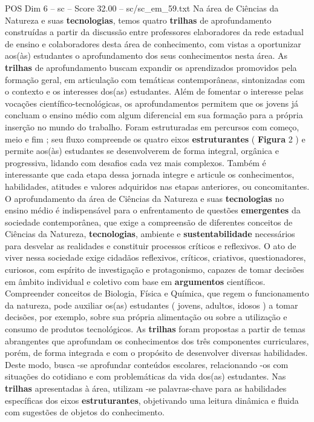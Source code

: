 \begin{textsample}{POS Dim 6 – sc – Score 32.00 – sc/sc\_em\_59.txt}
Na área de Ciências da Natureza e suas \textbf{tecnologias}, temos quatro \textbf{trilhas} de aprofundamento construídas a partir da discussão entre professores elaboradores da rede estadual de ensino e colaboradores desta área de conhecimento, com vistas a oportunizar aos(às) estudantes o aprofundamento dos seus conhecimentos nesta área.
As \textbf{trilhas} de aprofundamento buscam expandir os aprendizados promovidos pela formação geral, em articulação com temáticas contemporâneas, sintonizadas com o contexto e os interesses dos(as) estudantes.
Além de fomentar o interesse pelas vocações científico-tecnológicas, os aprofundamentos permitem que os jovens já concluam o ensino médio com algum diferencial em sua formação para a própria inserção no mundo do trabalho.
Foram estruturadas em percursos com começo, meio e fim ; seu fluxo compreende os quatro eixos \textbf{estruturantes} ( \textbf{Figura} 2 ) e permite aos(às) estudantes se desenvolverem de forma integral, orgânica e progressiva, lidando com desafios cada vez mais complexos.
Também é interessante que cada etapa dessa jornada integre e articule os conhecimentos, habilidades, atitudes e valores adquiridos nas etapas anteriores, ou concomitantes.
O aprofundamento da área de Ciências da Natureza e suas \textbf{tecnologias} no ensino médio é indispensável para o enfrentamento de questões \textbf{emergentes} da sociedade contemporânea, que exige a compreensão de diferentes conceitos de Ciências da Natureza, \textbf{tecnologias}, ambiente e \textbf{sustentabilidade} necessários para desvelar as realidades e constituir processos críticos e reflexivos.
O ato de viver nessa sociedade exige cidadãos reflexivos, críticos, criativos, questionadores, curiosos, com espírito de investigação e protagonismo, capazes de tomar decisões em âmbito individual e coletivo com base em \textbf{argumentos} científicos.
Compreender conceitos de Biologia, Física e Química, que regem o funcionamento da natureza, pode auxiliar os(as) estudantes ( jovens, adultos, idosos ) a tomar decisões, por exemplo, sobre sua própria alimentação ou sobre a utilização e consumo de produtos tecnológicos.
As \textbf{trilhas} foram propostas a partir de temas abrangentes que aprofundam os conhecimentos dos três componentes curriculares, porém, de forma integrada e com o propósito de desenvolver diversas habilidades.
Deste modo, busca -se aprofundar conteúdos escolares, relacionando -os com situações do cotidiano e com problemáticas da vida dos(as) estudantes.
Nas \textbf{trilhas} apresentadas à área, utilizam -se palavras-chave para as habilidades específicas dos eixos \textbf{estruturantes}, objetivando uma leitura dinâmica e fluida com sugestões de objetos do conhecimento.

\end{textsample}
